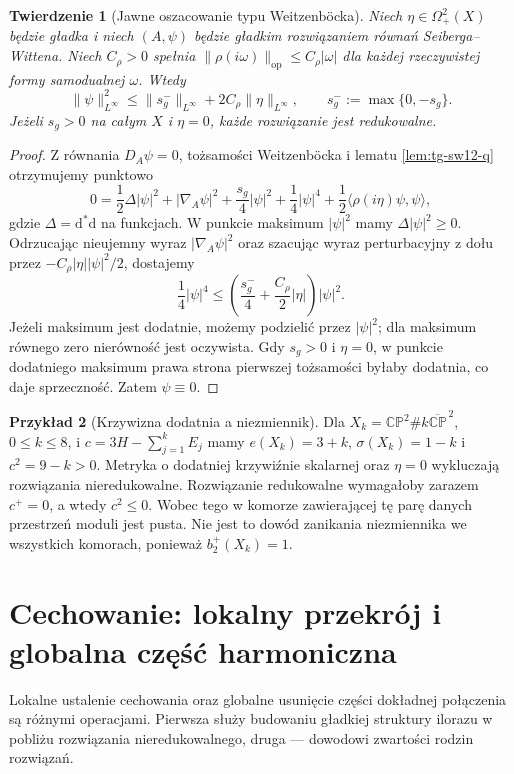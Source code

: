 \documentclass[11pt,a4paper]{report}
\numberwithin{equation}{section}
\theoremstyle{plain}
\newtheorem{twierdzenie}{Twierdzenie}[section]
\theoremstyle{definition}
\newtheorem{przyklad}[twierdzenie]{Przykład}
\theoremstyle{remark}
\begin{document}
\begin{twierdzenie}[Jawne oszacowanie typu Weitzenböcka]
\label{thm:tg-sw12-spinor-bound}
Niech $\eta\in\Omega^2_+(X)$ będzie gładka i niech $(A,\psi)$
będzie gładkim rozwiązaniem równań Seiberga--Wittena.
Niech $C_\rho>0$ spełnia
$\|\rho(i\omega)\|_{\mathrm{op}}\le C_\rho|\omega|$
dla każdej rzeczywistej formy samodualnej $\omega$.
Wtedy
\[
\|\psi\|_{L^\infty}^2\le
\|s_g^-\|_{L^\infty}+2C_\rho\|\eta\|_{L^\infty},
\qquad s_g^-:=\max\{0,-s_g\}.
\]
Jeżeli $s_g>0$ na całym $X$ i $\eta=0$, każde rozwiązanie
jest redukowalne.
\end{twierdzenie}

\begin{proof}
Z równania $D_A\psi=0$, tożsamości Weitzenböcka i
lematu \ref{lem:tg-sw12-q} otrzymujemy punktowo
\[
0=\frac12\Delta|\psi|^2+|\nabla_A\psi|^2
 +\frac{s_g}{4}|\psi|^2+\frac14|\psi|^4
 +\frac12\langle\rho(i\eta)\psi,\psi\rangle,
\]
gdzie $\Delta=\mathrm d^*\mathrm d$ na funkcjach.
W punkcie maksimum $|\psi|^2$ mamy $\Delta|\psi|^2\ge0$.
Odrzucając nieujemny wyraz $|\nabla_A\psi|^2$ oraz
szacując wyraz perturbacyjny z dołu przez
$-C_\rho|\eta||\psi|^2/2$, dostajemy
\[
\frac14|\psi|^4\le
\left(\frac{s_g^-}{4}+\frac{C_\rho}{2}|\eta|\right)
|\psi|^2.
\]
Jeżeli maksimum jest dodatnie, możemy podzielić przez
$|\psi|^2$; dla maksimum równego zero nierówność jest
oczywista. Gdy $s_g>0$ i $\eta=0$, w punkcie dodatniego
maksimum prawa strona pierwszej tożsamości byłaby dodatnia,
co daje sprzeczność. Zatem $\psi\equiv0$.
\end{proof}

\begin{przyklad}[Krzywizna dodatnia a niezmiennik]
Dla $X_k=\mathbb{CP}^2\#k\overline{\mathbb{CP}}^{\,2}$,
$0\le k\le8$, i $c=3H-\sum_{j=1}^kE_j$ mamy
$e(X_k)=3+k$, $\sigma(X_k)=1-k$ i $c^2=9-k>0$.
Metryka o dodatniej krzywiźnie skalarnej oraz $\eta=0$
wykluczają rozwiązania nieredukowalne. Rozwiązanie redukowalne
wymagałoby zarazem $c^+=0$, a wtedy $c^2\le0$.
Wobec tego w komorze zawierającej tę parę danych przestrzeń
moduli jest pusta. Nie jest to dowód zanikania niezmiennika
we wszystkich komorach, ponieważ $b_2^+(X_k)=1$.
\end{przyklad}

\section{Cechowanie: lokalny przekrój i globalna część harmoniczna}
\label{sec:tg-sw12-slice}

Lokalne ustalenie cechowania oraz globalne usunięcie części
dokładnej połączenia są różnymi operacjami. Pierwsza służy
budowaniu gładkiej struktury ilorazu w pobliżu rozwiązania
nieredukowalnego, druga --- dowodowi zwartości rodzin rozwiązań.
\end{document}
